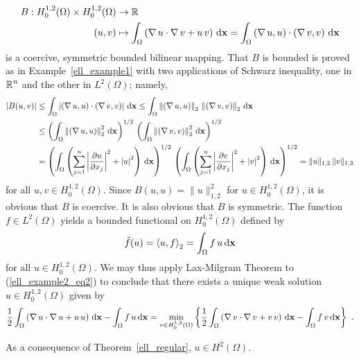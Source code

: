 \begin{egg}
\begin{align*}
B:H^{1,2}_0(\Omega) \times H^{1,2}_0(\Omega) &\rightarrow \mathbb{R} \\
(u,v) &\mapsto \int_\Omega \left( \operatorname{\nabla} u \cdot \operatorname{\nabla} v
+ u\, v \right) \,\mathrm{d}{\mathbf{x}}
= \int_\Omega \left( \operatorname{\nabla} u ,u \right)\cdot \left( \operatorname{\nabla} v, v \right)
\,\mathrm{d}{\mathbf{x}}
\end{align*}
is a coercive, symmetric bounded bilinear mapping.  That $B$ is bounded is
proved as in Example~\ref{ell_example1} with two applications of
Schwarz inequality, one in $\displaystyle \mathbb{R}^n$ and the other in
$\displaystyle L^2(\Omega)$;
namely,
\begin{align*}
|B(u,v)| &\leq \int_\Omega
\left| \left(\operatorname{\nabla} u, u\right) \cdot \left(\operatorname{\nabla} v, v\right) \right|
\,\mathrm{d}{\mathbf{x}}
\leq \int_\Omega \left\|\left(\operatorname{\nabla} u, u \right)\right\|_2\,
\left\| \left(\operatorname{\nabla} v, v\right)\right\|_2 \,\mathrm{d}{\mathbf{x}} \\
&\leq \left( \int_\Omega \left\|
\left(\operatorname{\nabla} u, u\right)\right\|_2^2 \,\mathrm{d}{\mathbf{x}} \right)^{1/2} \,
\left( \int_\Omega \left\|\left(\operatorname{\nabla} v, v \right)\right\|_2^2
\,\mathrm{d}{\mathbf{x}}\right)^{1/2} \\
&= \left( \int_\Omega \left( \sum_{j=1}^n
\left|\frac{\partial{u}}{\partial x_j}\right|^2+ \left|u\right|^2
\right) \,\mathrm{d}{\mathbf{x}} \right)^{1/2} \,
\left( \int_\Omega \left( \sum_{j=1}^n
\left|\frac{\partial{v}}{\partial x_j}\right|^2+ \left|v\right|^2
\right) \,\mathrm{d}{\mathbf{x}} \right)^{1/2}
= \| u\|_{1,2} \, \|v\|_{1,2}
\end{align*}
for all $\displaystyle u,v \in H^{1,2}_0(\Omega)$.
Since $\displaystyle B(u,u) = \|u\|_{1,2}^2$ for
$\displaystyle u\in H^{1,2}_0(\Omega)$, it is
obvious that $B$ is coercive.  It is also obvious that $B$ is
symmetric.  The function $\displaystyle f \in L^2(\Omega)$ yields a bounded
functional on $\displaystyle H^{1,2}_0(\Omega)$ defined by
\[
\tilde{f}(u) = \left\langle{u} , {f}\right\rangle_2 = \int_\Omega f\,u \,\mathrm{d}{\mathbf{x}}
\]
for all $\displaystyle u \in H^{1,2}_0(\Omega)$.
We may thus apply Lax-Milgram Theorem to (\ref{ell_example2_eq2}) to
conclude that there exists a unique weak solution 
$\displaystyle u \in H^{1,2}_0(\Omega)$ given by
\[
\frac{1}{2} \int_\Omega \left( \operatorname{\nabla} u \cdot \operatorname{\nabla} u 
+u\, u \right) \,\mathrm{d}{\mathbf{x}} -\int_\Omega f\, u \,\mathrm{d}{\mathbf{x}}
= \min_{v\in H^{1,2}_0(\Omega)} \left\{ \frac{1}{2}
\int_\Omega \left( \operatorname{\nabla} v \cdot \operatorname{\nabla} v +v\, v \right) \,\mathrm{d}{\mathbf{x}}
-\int_\Omega f\, v \,\mathrm{d}{\mathbf{x}} \right\} \ .
\]

As a consequence of Theorem~\ref{ell_regular}, $\displaystyle u\in H^2(\Omega)$.


\end{egg}
